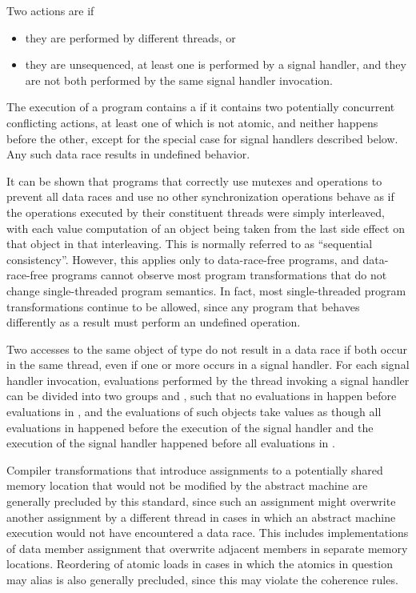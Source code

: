 \pnum
Two actions are  if
\begin{itemize}
\item they are performed by different threads, or
\item they are unsequenced, at least one is performed by a signal handler, and
they are not both performed by the same signal handler invocation.
\end{itemize}
%
The execution of a program contains a  if it contains two
potentially concurrent conflicting actions, at least one of which is not atomic,
and neither happens before the other,
except for the special case for signal handlers described below.
Any such data race results in undefined
behavior. \begin{note} It can be shown that programs that correctly use mutexes
and  operations to prevent all data races and use no
other synchronization operations behave as if the operations executed by their
constituent threads were simply interleaved, with each
%
value computation of an
object being taken from the last
%
side effect on that object in that
interleaving. This is normally referred to as ``sequential consistency''.
However, this applies only to data-race-free programs, and data-race-free
programs cannot observe most program transformations that do not change
single-threaded program semantics. In fact, most single-threaded program
transformations continue to be allowed, since any program that behaves
differently as a result must perform an undefined operation. \end{note}

\pnum
Two accesses to the same object of type  do not
result in a data race if both occur in the same thread, even if one or more
occurs in a signal handler. For each signal handler invocation, evaluations
performed by the thread invoking a signal handler can be divided into two
groups  and , such that no evaluations in
 happen before evaluations in , and the
evaluations of such  objects take values as though
all evaluations in  happened before the execution of the signal
handler and the execution of the signal handler happened before all evaluations
in .

\pnum
\begin{note} Compiler transformations that introduce assignments to a potentially
shared memory location that would not be modified by the abstract machine are
generally precluded by this standard, since such an assignment might overwrite
another assignment by a different thread in cases in which an abstract machine
execution would not have encountered a data race. This includes implementations
of data member assignment that overwrite adjacent members in separate memory
locations. Reordering of atomic loads in cases in which the atomics in question
may alias is also generally precluded, since this may violate the coherence
rules. \end{note}


